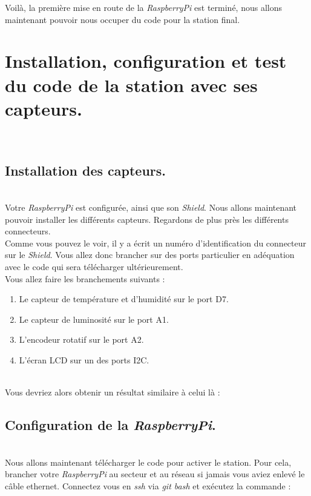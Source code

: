 Voilà, la première mise en route de la \textit{RaspberryPi} est terminé, nous allons maintenant pouvoir nous occuper du code pour la station final.

\section{Installation, configuration et test du code de la station avec ses capteurs.}\\

\subsection{Installation des capteurs.}\\

Votre \textit{RaspberryPi} est configurée, ainsi que son \textit{Shield}. Nous allons maintenant pouvoir installer les différents capteurs. Regardons de plus près les différents connecteurs. %
\\
Comme vous pouvez le voir, il y a écrit un numéro d'identification du connecteur sur le \textit{Shield}. Vous allez donc brancher sur des ports particulier en adéquation avec le code qui sera télécharger ultérieurement.\\

Vous allez faire les branchements suivants :
\begin{enumerate}
	\item Le capteur de température et d'humidité sur le port D7. %
	\item Le capteur de luminosité sur le port A1. %
	\item L'encodeur rotatif sur le port A2. %
	\item L'écran LCD sur un des ports I2C. %
\end{enumerate}\\

Vous devriez alors obtenir un résultat similaire à celui là : %

\subsection{Configuration de la \textit{RaspberryPi}.}\\

Nous allons maintenant télécharger le code pour activer le station. Pour cela, brancher votre \textit{RaspberryPi} au secteur et au réseau si jamais vous aviez enlevé le câble ethernet. Connectez vous en \textit{ssh} via \textit{git bash} et exécutez la commande : 

